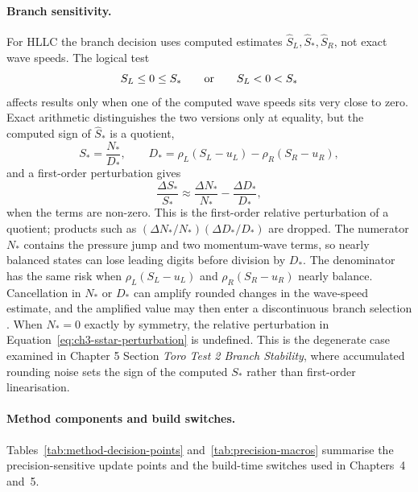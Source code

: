 \paragraph{Branch sensitivity.}
For HLLC the branch decision uses computed estimates
\(\widehat S_L,\widehat S_\ast,\widehat S_R\), not exact wave speeds. The
logical test
\begin{equation}\label{eq:ch3-branch-test}
  S_L \le 0 \le S_\ast
  \qquad\hbox{or}\qquad
  S_L < 0 < S_\ast
\end{equation}
affects results only when one of the computed wave speeds sits very close to
zero. Exact arithmetic distinguishes the two versions only at equality, but the
computed sign of \(\widehat S_\ast\) is a quotient,
\begin{equation}\label{eq:ch3-sstar-decomp}
  S_\ast=\frac{N_\ast}{D_\ast}, \qquad
  D_\ast=\rho_L(S_L-u_L)-\rho_R(S_R-u_R),
\end{equation}
and a first-order perturbation gives
\begin{equation}\label{eq:ch3-sstar-perturbation}
  \frac{\Delta S_\ast}{S_\ast}
  \approx
  \frac{\Delta N_\ast}{N_\ast}
  -
  \frac{\Delta D_\ast}{D_\ast},
\end{equation}
when the terms are non-zero. This is the first-order relative perturbation of
a quotient; products such as
\((\Delta N_\ast/N_\ast)(\Delta D_\ast/D_\ast)\) are dropped. The numerator
\(N_\ast\) contains the pressure jump and two momentum-wave terms, so nearly
balanced states can lose leading digits before division by \(D_\ast\). The
denominator has the same risk when
\(\rho_L(S_L-u_L)\) and \(\rho_R(S_R-u_R)\) nearly balance. Cancellation in
\(N_\ast\) or \(D_\ast\) can amplify rounded changes in the wave-speed estimate,
and the amplified value may then enter a discontinuous branch selection
\citep{toro2009}. When $N_\ast = 0$ exactly by symmetry, the relative perturbation in Equation~\ref{eq:ch3-sstar-perturbation} is undefined. This is the degenerate case examined in Chapter 5 Section \emph{Toro Test 2 Branch Stability}, where accumulated rounding noise sets the sign of the computed $S_\ast$ rather than first-order linearisation.

\paragraph{Method components and build switches.}
Tables~\ref{tab:method-decision-points} and~\ref{tab:precision-macros}
summarise the precision-sensitive update points and the build-time switches used
in Chapters~4 and~5.

